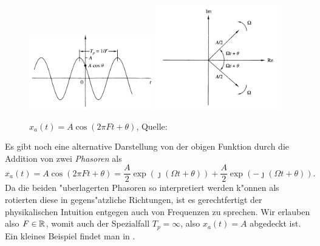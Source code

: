 \begin{figure}[t]
    \begin{center}
        \includegraphics[width=0.48\textwidth]{img/sampling/analog_cosine.png}
        \includegraphics[width=0.48\textwidth]{img/sampling/two_phasors.png}
    \end{center}
    \caption{$x_a(t) = A \cos(2 \pi F t + \theta)$, Quelle: \cite{proakis2013}}\label{fig:analog_cosine}
\end{figure}
%
Es gibt noch eine alternative Darstellung von der obigen Funktion durch die Addition von zwei \emph{Phasoren} als
\[
    x_a(t) 
        = A \cos(2 \pi F t + \theta) 
        = \frac A2 \exp(\jmath (\Omega t + \theta)) 
            + \frac A2 \exp(- \jmath (\Omega t + \theta)).
\]
Da die beiden "uberlagerten Phasoren so interpretiert werden k"onnen als rotierten diese in gegens"atzliche Richtungen, ist es gerechtfertigt der physikalischen Intuition entgegen auch von  Frequenzen zu sprechen.
Wir erlauben also $F \in \mathbb{R}$, womit auch der Spezialfall $T_p = \infty$, also $x_a(t) = A$ abgedeckt ist.
Ein kleines Beispiel findet man in .
%
